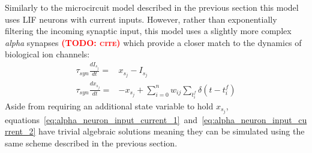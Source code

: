 \documentclass[utf8]{frontiersSCNS} %
\newcommand{\todo}[1]{\textbf{\textsc{\textcolor{red}{(TODO: #1)}}}}
\begin{document}
Similarly to the microcircuit model described in the previous section this model uses LIF neurons with current inputs.
However, rather than exponentially filtering the incoming synaptic input, this model uses a slightly more complex \textit{alpha} synapses \todo{cite} which provide a closer match to the dynamics of biological ion channels:
%
\begin{align}
    \tau_{syn} \frac{dI_{s_{j}}}{dt} = & x_{s_{j}} - I_{s_{j}} \label{eq:alpha_neuron_input_current_1}\\ 
    \tau_{syn} \frac{dx_{s_{j}}}{dt} = & -x_{s_{j}} + \sum_{i=0}^{n} w_{ij} \sum_{t_{i}^{f}}  \delta(t - t_{i}^{f}) \label{eq:alpha_neuron_input_current_2}
\end{align}
%
Aside from requiring an additional state variable to hold $x_{s_{j}}$, equations~\ref{eq:alpha_neuron_input_current_1}~and~\ref{eq:alpha_neuron_input_current_2} have trivial algebraic solutions meaning they can be simulated using the same scheme described in the previous section.
\end{document}
